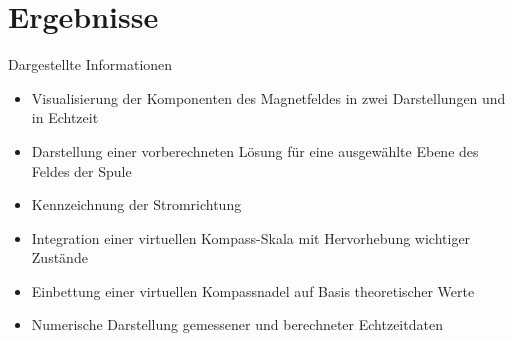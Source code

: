 \part{Ergebnisse}
\label{part:results}
\begin{frame}[fragile]{Dargestellte Informationen}
\pause
\begin{itemize}
	\item Visualisierung der Komponenten des Magnetfeldes in zwei Darstellungen und in Echtzeit
	\item Darstellung einer vorberechneten Lösung für eine ausgewählte Ebene des Feldes der Spule
	\item Kennzeichnung der Stromrichtung
	\item Integration einer virtuellen Kompass-Skala mit Hervorhebung wichtiger Zustände
	\item Einbettung einer virtuellen Kompassnadel auf Basis theoretischer Werte
	\item Numerische Darstellung gemessener und berechneter Echtzeitdaten
\end{itemize}
\end{frame}


